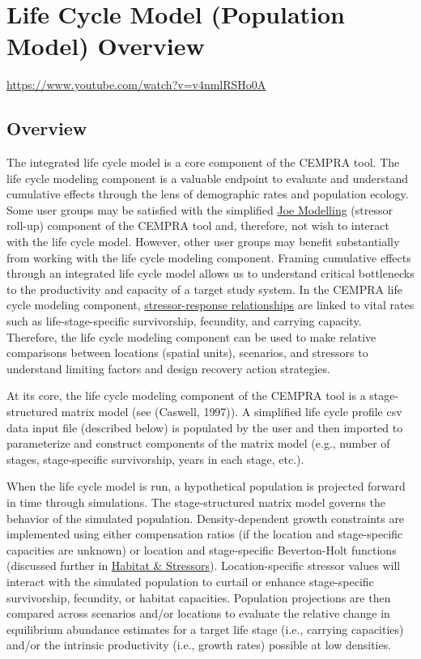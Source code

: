 \documentclass[
  letterpaper,
  DIV=11,
  numbers=noendperiod]{scrreprt}
\begin{document}
\chapter{Life Cycle Model (Population Model)
Overview}\label{life-cycle-model-population-model-overview}

\url{https://www.youtube.com/watch?v=v4nmlRSHo0A}

\section{Overview}\label{overview}

The integrated life cycle model is a core component of the CEMPRA tool.
The life cycle modeling component is a valuable endpoint to evaluate and
understand cumulative effects through the lens of demographic rates and
population ecology. Some user groups may be satisfied with the
simplified \hyperref[modelling-pathways-and-assessment-endpoints]{Joe
Modelling} (stressor roll-up) component of the CEMPRA tool and,
therefore, not wish to interact with the life cycle model. However,
other user groups may benefit substantially from working with the life
cycle modeling component. Framing cumulative effects through an
integrated life cycle model allows us to understand critical bottlenecks
to the productivity and capacity of a target study system. In the CEMPRA
life cycle modeling component,
\hyperref[stressor-response-functions]{stressor-response relationships}
are linked to vital rates such as life-stage-specific survivorship,
fecundity, and carrying capacity. Therefore, the life cycle modeling
component can be used to make relative comparisons between locations
(spatial units), scenarios, and stressors to understand limiting factors
and design recovery action strategies.

At its core, the life cycle modeling component of the CEMPRA tool is a
stage-structured matrix model (see (Caswell, 1997)). A simplified life
cycle profile csv data input file (described below) is populated by the
user and then imported to parameterize and construct components of the
matrix model (e.g., number of stages, stage-specific survivorship, years
in each stage, etc.).

When the life cycle model is run, a hypothetical population is projected
forward in time through simulations. The stage-structured matrix model
governs the behavior of the simulated population. Density-dependent
growth constraints are implemented using either compensation ratios (if
the location and stage-specific capacities are unknown) or location and
stage-specific Beverton-Holt functions (discussed further in
\href{08_life_cycle_model_part2.qmd}{Habitat \& Stressors}).
Location-specific stressor values will interact with the simulated
population to curtail or enhance stage-specific survivorship, fecundity,
or habitat capacities. Population projections are then compared across
scenarios and/or locations to evaluate the relative change in
equilibrium abundance estimates for a target life stage (i.e., carrying
capacities) and/or the intrinsic productivity (i.e., growth rates)
possible at low densities.
\end{document}
